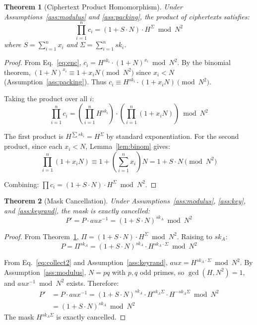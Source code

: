 \documentclass[11pt, a4paper]{article}
\newtheorem{theorem}{Theorem}[section]
\begin{document}
\begin{theorem}[Ciphertext Product Homomorphism]\label{thm:product}
Under Assumptions~\ref{ass:modulus} and \ref{ass:packing}, the product of ciphertexts satisfies:
$$\prod_{i=1}^{n} c_i = \left(1 + S \cdot N\right) \cdot H^{\Sigma} \bmod N^2$$
where $S = \sum_{i=1}^n x_i$ and $\Sigma = \sum_{i=1}^n sk_i$.
\end{theorem}

\begin{proof}
From Eq.~\ref{eq:enc}, $c_i = H^{sk_i} \cdot (1+N)^{x_i} \bmod N^2$. By the binomial theorem, $(1+N)^{x_i} \equiv 1 + x_i N \pmod{N^2}$ since $x_i < N$ (Assumption~\ref{ass:packing}). Thus $c_i \equiv H^{sk_i} \cdot (1 + x_i N) \pmod{N^2}$.

Taking the product over all $i$:
$$\prod_{i=1}^n c_i = \left(\prod_{i=1}^n H^{sk_i}\right) \cdot \left(\prod_{i=1}^n (1 + x_i N)\right) \bmod N^2$$

The first product is $H^{\sum sk_i} = H^{\Sigma}$ by standard exponentiation. For the second product, since each $x_i < N$, Lemma~\ref{lem:binom} gives:
$$\prod_{i=1}^n (1 + x_i N) \equiv 1 + \left(\sum_{i=1}^n x_i\right) N = 1 + S \cdot N \pmod{N^2}$$

Combining: $\prod c_i = (1 + S \cdot N) \cdot H^{\Sigma} \bmod N^2$.
\end{proof}

\begin{theorem}[Mask Cancellation]\label{thm:mask}
Under Assumptions~\ref{ass:modulus}, \ref{ass:key}, and \ref{ass:keyrand}, the mask is exactly cancelled:
$$P' = P \cdot aux^{-1} = (1 + S \cdot N)^{sk_A} \bmod N^2$$
\end{theorem}

\begin{proof}
From Theorem~\ref{thm:product}, $\Pi = (1 + S \cdot N) \cdot H^{\Sigma} \bmod N^2$. Raising to $sk_A$:
$$P = \Pi^{sk_A} = (1 + S \cdot N)^{sk_A} \cdot H^{sk_A \cdot \Sigma} \bmod N^2$$

From Eq.~\ref{eq:collect2} and Assumption~\ref{ass:keyrand}, $aux = H^{sk_A \cdot \Sigma} \bmod N^2$. By Assumption~\ref{ass:modulus}, $N = pq$ with $p, q$ odd primes, so $\gcd(H, N^2) = 1$, and $aux^{-1} \bmod N^2$ exists. Therefore:
\begin{align*}
P' &= P \cdot aux^{-1} = (1 + S \cdot N)^{sk_A} \cdot H^{sk_A \Sigma} \cdot H^{-sk_A \Sigma} \bmod N^2 \\
&= (1 + S \cdot N)^{sk_A} \bmod N^2
\end{align*}
The mask $H^{sk_A \Sigma}$ is exactly cancelled.
\end{proof}
\end{document}
